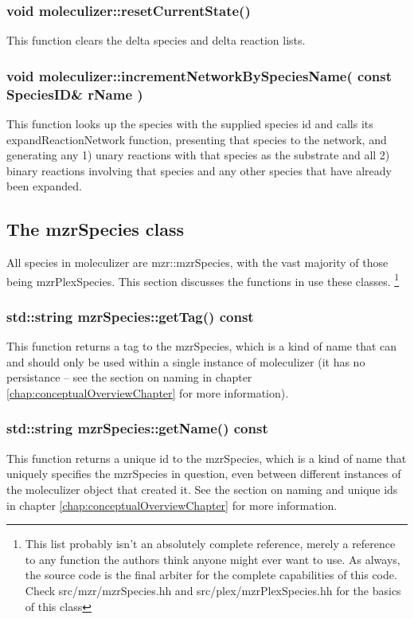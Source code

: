 \subsubsection{void moleculizer::resetCurrentState()}
This function clears the delta species and delta reaction lists.  

\subsubsection{void moleculizer::incrementNetworkBySpeciesName( const
  SpeciesID\& rName )}
This function looks up the species with the supplied species id and
calls its expandReactionNetwork function, presenting that species to
the network, and generating any 1) unary reactions with that species
as the substrate and all 2) binary reactions involving that species
and any other species that have already been expanded.

\subsection{The mzrSpecies class}

All species in moleculizer are mzr::mzrSpecies, with the vast majority of
those being mzrPlexSpecies.  This section discusses the functions in
use these classes.  \footnote{This list probably isn't an absolutely
  complete reference, merely a reference to any function the authors
  think anyone might ever want to use.  As always, the source code is
  the final arbiter for the complete capabilities of this code.  Check
  src/mzr/mzrSpecies.hh and src/plex/mzrPlexSpecies.hh for the basics
  of this class}

\subsubsection{std::string mzrSpecies::getTag() const}
This function returns a tag to the mzrSpecies, which is a kind of name
that can and should only be used within a single instance of
moleculizer (it has no persistance -- see the section on naming in
chapter \ref{chap:conceptualOverviewChapter} for more information).

\subsubsection{std::string mzrSpecies::getName() const}
This function returns a unique id to the mzrSpecies, which is a kind
of name that uniquely specifies the mzrSpecies in question, even
between different instances of the moleculizer object that created
it.  See the section on naming and unique ids in chapter
\ref{chap:conceptualOverviewChapter} for more information. 


